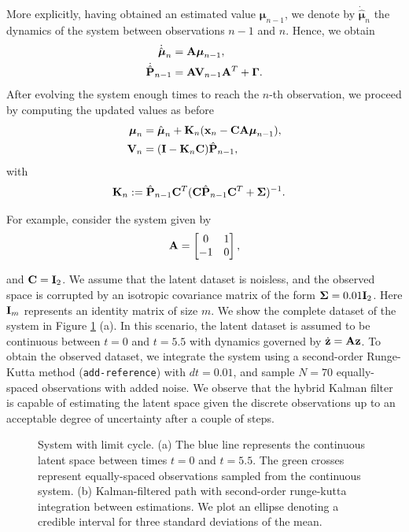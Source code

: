 \documentclass[11pt]{article}
\numberwithin{equation}{section}
\newcommand{\x}{{\bf x}}
\begin{document}
More explicitly, having obtained an estimated value $\boldsymbol{\mu}_{n-1}$, we denote by $\dot{\hat{\boldsymbol{\mu}}}_n$ the dynamics of the system between observations $n-1$ and $n$. Hence, we obtain
\begin{align}
	\dot{\hat{\boldsymbol{\mu}}}_n &= {\bf A}\boldsymbol{\mu}_{n-1},\\
	\dot{\hat{{\bf P}}}_{n-1} &= {\bf A}{\bf V}_{n-1}{\bf A}^T + \boldsymbol{\Gamma}.
\end{align}
After evolving the system enough times to reach the $n$-th observation, we proceed by computing the updated values as before
\begin{align}
	\boldsymbol{\mu}_n &= \hat{\boldsymbol{\mu}}_n + {\bf K}_n(\x_n -{\bf C}{\bf A}\boldsymbol\mu_{n-1}),\\
	{\bf V}_n &=  ({\bf I} - {\bf K}_n{\bf C})\hat{\bf P}_{n-1},
\end{align}	
with
\begin{align}
	{\bf K}_n &:= \hat{\bf P}_{n-1}{\bf C}^T({\bf C} \hat{\bf P}_{n-1}{\bf C}^T + \boldsymbol\Sigma)^{-1}.
\end{align}

For example, consider the system given by
\begin{align}
	{\bf A} = \begin{bmatrix}
		0 & 1\\
		-1 & 0
	\end{bmatrix},
\end{align}

and ${\bf C} = {\bf I}_2$. We assume that the latent dataset is noisless, and the observed space is corrupted by an isotropic covariance matrix of the form $\boldsymbol{\Sigma} = 0.01 {\bf I}_2$. Here ${\bf I}_m$ represents an identity matrix of size $m$. We show the complete dataset of the system in Figure \ref{fig:hybrid-kalman-filter} (a). In this scenario, the latent dataset is assumed to be continuous between $t=0$ and $t=5.5$ with dynamics governed by $\dot{\bf z} = {\bf A z}$. To obtain the observed dataset, we integrate the system using a second-order Runge-Kutta method (\texttt{add-reference}) with $dt=0.01$, and sample $N=70$ equally-spaced observations with added noise. We observe that the hybrid Kalman filter is capable of estimating the latent space given the discrete observations up to an acceptable degree of uncertainty after a couple of steps.

\begin{figure}
	\hfill
	\hfill
	\hfill
	\caption{System with limit cycle. (a) The blue line represents the continuous latent space between times $t=0$ and $t=5.5$. The green crosses represent equally-spaced observations sampled from the continuous system. (b) Kalman-filtered path with second-order runge-kutta integration between estimations. We plot an ellipse denoting a credible interval for three standard deviations of the mean.}
	\label{fig:hybrid-kalman-filter}
\end{figure}
\end{document}

